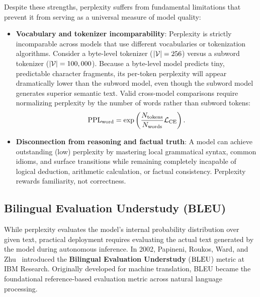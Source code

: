 \documentclass[../../main.tex]{subfiles}
\begin{document}
Despite these strengths, perplexity suffers from fundamental limitations that prevent it from serving as a universal measure of model quality:
\begin{itemize}
    \item \textbf{Vocabulary and tokenizer incomparability}: Perplexity is strictly incomparable across models that use different vocabularies or tokenization algorithms. Consider a byte-level tokenizer ($|\mathcal{V}| = 256$) versus a subword tokenizer ($|\mathcal{V}| = 100,000$). Because a byte-level model predicts tiny, predictable character fragments, its per-token perplexity will appear dramatically lower than the subword model, even though the subword model generates superior semantic text. Valid cross-model comparisons require normalizing perplexity by the number of words rather than subword tokens:
    \begin{equation}
    \label{eq:word_level_normalized_ppl}
    \mathrm{PPL}_{\text{word}} = \exp\left( \frac{N_{\text{tokens}}}{N_{\text{words}}} \mathcal{L}_{\text{CE}} \right).
    \end{equation}
    \item \textbf{Disconnection from reasoning and factual truth}: A model can achieve outstanding (low) perplexity by mastering local grammatical syntax, common idioms, and surface transitions while remaining completely incapable of logical deduction, arithmetic calculation, or factual consistency. Perplexity rewards familiarity, not correctness.
\end{itemize}

\subsection{Bilingual Evaluation Understudy (BLEU)}
\label{subsec:bleu}

While perplexity evaluates the model's internal probability distribution over given text, practical deployment requires evaluating the actual text generated by the model during autonomous inference. In 2002, Papineni, Roukos, Ward, and Zhu~\cite{papineni2002bleu} introduced the \textbf{Bilingual Evaluation Understudy} ($\mathrm{BLEU}$) metric at IBM Research. Originally developed for machine translation, BLEU became the foundational reference-based evaluation metric across natural language processing.
\end{document}
